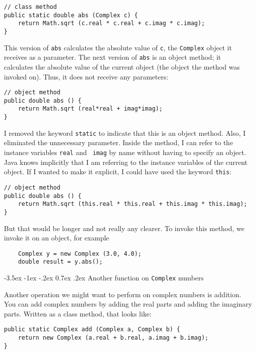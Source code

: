 \documentclass{book}
\makeatletter
\renewcommand{\section}{\@startsection 
    {section} {1} {0mm}%
    {-3.5ex \@plus -1ex \@minus -.2ex}%
    {0.7ex \@plus.2ex}%
    {\normalfont\Large\bfseries}}
\makeatother
\begin{document}
\begin{verbatim}
// class method
public static double abs (Complex c) {
    return Math.sqrt (c.real * c.real + c.imag * c.imag);
} 
\end{verbatim}
%
This version of {\tt abs} calculates the absolute value of {\tt c},
the {\tt Complex} object it receives as a parameter.  The next version
of {\tt abs} is an object method; it calculates the absolute value of
the current object (the object the method was invoked on).  Thus,
it does not receive any parameters:

\begin{verbatim}
// object method
public double abs () {
    return Math.sqrt (real*real + imag*imag);
}
\end{verbatim}
%
I removed the keyword {\tt static} to indicate that this is an object
method.  Also, I eliminated the unnecessary parameter.  Inside the
method, I can refer to the instance variables {\tt real} and {\tt
imag} by name without having to specify an object.  Java knows
implicitly that I am referring to the instance variables of the
current object.  If I wanted to make it explicit, I could have used
the keyword {\tt this}:

\begin{verbatim}
// object method
public double abs () {
    return Math.sqrt (this.real * this.real + this.imag * this.imag);
}
\end{verbatim}

But that would be longer and not really any clearer.  To invoke
this method, we invoke it on an object, for example

\begin{verbatim}
    Complex y = new Complex (3.0, 4.0);
    double result = y.abs();
\end{verbatim}


\section{Another function on {\tt Complex} numbers}

Another operation we might want to perform on complex numbers
is addition.  You can add complex numbers by adding the real
parts and adding the imaginary parts.  Written as a class method,
that looks like:

\begin{verbatim}
public static Complex add (Complex a, Complex b) {
    return new Complex (a.real + b.real, a.imag + b.imag);
}
\end{verbatim}
\end{document}
